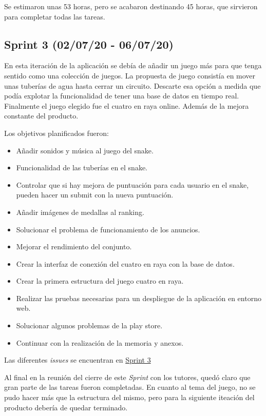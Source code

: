 Se estimaron unas 53 horas, pero se acabaron destinando 45 horas, que sirvieron para completar todas las tareas.

\subsection{Sprint 3 (02/07/20 - 06/07/20)}\label{sprint-3-020720---070720}
En esta iteración de la aplicación se debía de añadir un juego más para que tenga sentido como una colección de juegos. La propuesta de juego consistía en mover unas tuberías de agua hasta cerrar un circuito. Descarte esa opción a medida que podía explotar la funcionalidad de tener una base de datos en tiempo real. Finalmente el juego elegido fue el cuatro en raya online. Además de la mejora constante del producto.

Los objetivos planificados fueron:
\begin{itemize}
	\item Añadir sonidos y música al juego del snake.
	\item Funcionalidad de las tuberías en el snake.
	\item Controlar que si hay mejora de puntuación para cada usuario en el snake, pueden hacer un submit con la nueva puntuación.
	\item Añadir imágenes de medallas al ranking.
	\item Solucionar el problema de funcionamiento de los anuncios.
	\item Mejorar el rendimiento del conjunto.
	\item Crear la interfaz de conexión del cuatro en raya con la base de datos.
	\item Crear la primera estructura del juego cuatro en raya.
	\item Realizar las pruebas necesarias para un despliegue de la aplicación en entorno web.
	\item Solucionar algunos problemas de la play store.
	\item Continuar con la realización de la memoria y anexos.
\end{itemize}

Las diferentes \emph{issues} se encuentran en \href{https://github.com/scc0034/flutter_serpiente/milestone/3?closed=1}{Sprint 3}


Al final en la reunión del cierre de este \emph{Sprint} con los tutores, quedó claro que gran parte de las tareas fueron completadas. En cuanto al tema del juego, no se pudo hacer más que la estructura del mismo, pero para la siguiente iteación del producto debería de quedar terminado.


